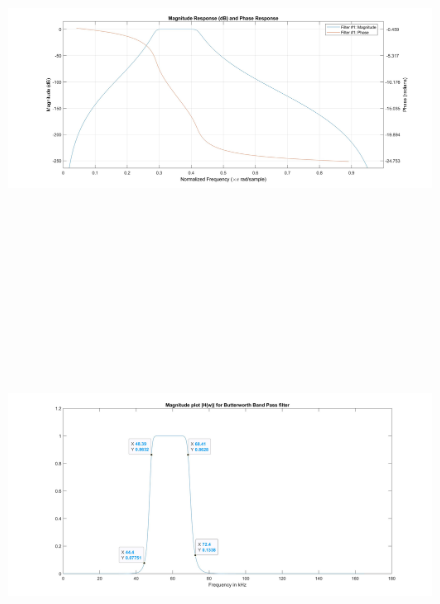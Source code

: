 \documentclass[12pt]{article}
\begin{document}
	\begin{figure}[H]
		\centering
		\includegraphics[width = 16cm, height = 10cm]{Filter1MagPhase.jpg}
	\end{figure}
	\begin{figure}[H]
		\centering
		\includegraphics[width = 16cm, height = 10cm]{Filter1DBPF.png}
	\end{figure}

	\color{cyan}
\end{document}
